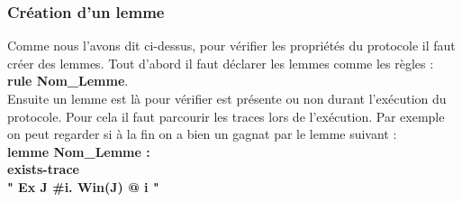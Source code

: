 \documentclass[conference]{IEEEtran}
\begin{document}
\subsubsection{Création d'un lemme} 
Comme nous l'avons dit ci-dessus, pour vérifier les propriétés du protocole il faut créer des lemmes. Tout d'abord il faut déclarer les lemmes comme les règles : \textbf{rule Nom\_Lemme}.\\
Ensuite un lemme est là pour vérifier est présente ou non durant l'exécution du protocole. Pour cela il faut parcourir les traces lors de l'exécution. Par exemple on peut regarder si à la fin on a bien un gagnat par le lemme suivant :\\
\textbf{lemme Nom\_Lemme : }\\
\textbf{exists-trace}\\
\textbf{" Ex J #i. Win(J) @ i "}

\newpage
\end{document}
